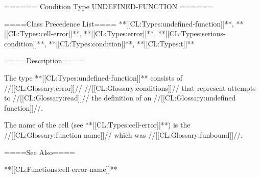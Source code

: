 ====== Condition Type UNDEFINED-FUNCTION ======

====Class Precedence List==== **[[CL:Types:undefined-function]]**, **[[CL:Types:cell-error]]**, **[[CL:Types:error]]**, **[[CL:Types:serious-condition]]**, **[[CL:Types:condition]]**, **[[CL:Types:t]]**

====Description====

The type **[[CL:Types:undefined-function]]** consists of //[[CL:Glossary:error]]// //[[CL:Glossary:conditions]]// that represent attempts to //[[CL:Glossary:read]]// the definition of an //[[CL:Glossary:undefined function]]//.

The name of the cell (see **[[CL:Types:cell-error]]**) is the //[[CL:Glossary:function name]]// which was //[[CL:Glossary:funbound]]//.

====See Also====

**[[CL:Functions:cell-error-name]]**

